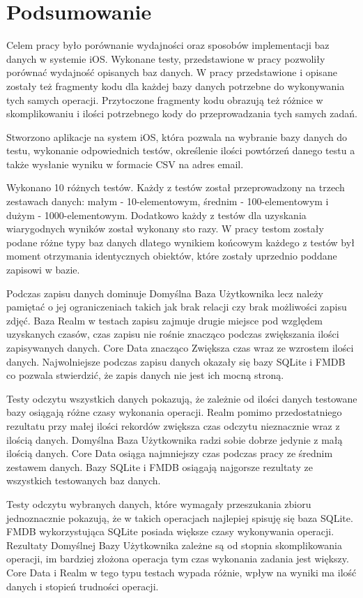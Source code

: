\section{Podsumowanie}

Celem pracy było porównanie wydajności oraz sposobów implementacji baz danych w systemie iOS. Wykonane testy, przedstawione w pracy pozwoliły porównać wydajność opisanych  baz danych. W pracy przedstawione i opisane zostały też fragmenty kodu dla każdej bazy danych potrzebne do wykonywania tych samych operacji. Przytoczone fragmenty kodu obrazują też różnice w skomplikowaniu i ilości potrzebnego kody do przeprowadzania tych samych zadań. 

Stworzono aplikacje na system iOS, która pozwala na wybranie bazy danych do testu, wykonanie odpowiednich testów, określenie ilości powtórzeń danego testu a także wysłanie wyniku w formacie CSV na adres email. 

Wykonano 10 różnych testów. Każdy z testów został przeprowadzony na trzech zestawach danych: małym - 10-elementowym, średnim - 100-elementowym i dużym - 1000-elementowym. Dodatkowo każdy z testów dla uzyskania wiarygodnych wyników został wykonany sto razy. W pracy testom zostały podane różne typy baz danych dlatego wynikiem końcowym każdego z testów był moment otrzymania identycznych obiektów, które zostały uprzednio poddane zapisowi w bazie. 

Podczas zapisu danych dominuje Domyślna Baza Użytkownika lecz należy pamiętać o jej ograniczeniach takich jak brak relacji czy brak możliwości zapisu zdjęć. Baza Realm w testach zapisu zajmuje drugie miejsce pod względem uzyskanych czasów, czas zapisu nie rośnie znacząco podczas zwiększania ilości zapisywanych danych. Core Data znacząco Zwiększa czas wraz ze wzrostem ilości danych. Najwolniejsze podczas zapisu danych okazały się bazy SQLite i FMDB co pozwala stwierdzić, że zapis danych nie jest ich mocną stroną. 

Testy odczytu wszystkich danych pokazują, że zależnie od ilości danych testowane bazy osiągają różne czasy wykonania operacji. Realm pomimo przedostatniego rezultatu przy małej ilości rekordów zwiększa czas odczytu nieznacznie wraz z ilością danych. Domyślna Baza Użytkownika radzi sobie dobrze jedynie z małą ilością danych. Core Data osiąga najmniejszy czas podczas pracy ze średnim zestawem danych. Bazy SQLite i FMDB osiągają najgorsze rezultaty ze wszystkich testowanych baz danych. 

Testy odczytu wybranych danych, które wymagały przeszukania zbioru jednoznacznie pokazują, że w takich operacjach najlepiej spisuję się baza SQLite. FMDB wykorzystująca SQLite posiada większe czasy wykonywania operacji. Rezultaty Domyślnej Bazy Użytkownika zależne są od stopnia skomplikowania operacji, im bardziej złożona operacja tym czas wykonania zadania jest większy. Core Data i Realm w tego typu testach wypada różnie, wpływ na wyniki ma ilość danych i stopień trudności operacji.

